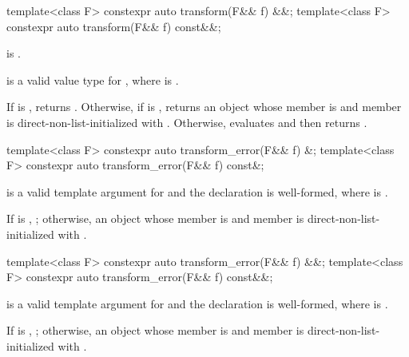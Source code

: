 %
\begin{itemdecl}
template<class F> constexpr auto transform(F&& f) &&;
template<class F> constexpr auto transform(F&& f) const&&;
\end{itemdecl}

\begin{itemdescr}
\pnum
\constraints
{} is .

\pnum
\mandates
{} is a valid value type for , where  is .

\pnum
\effects
If  is , returns . Otherwise, if  is , returns an  object whose  member is  and  member is direct-non-list-initialized with . Otherwise, evaluates  and then returns .
\end{itemdescr}

%
\begin{itemdecl}
template<class F> constexpr auto transform_error(F&& f) &;
template<class F> constexpr auto transform_error(F&& f) const&;
\end{itemdecl}

\begin{itemdescr}
\pnum
\mandates
{} is a valid template argument for  and the declaration  is well-formed, where  is .

\pnum
\returns
If  is , ; otherwise, an  object whose  member is  and  member is direct-non-list-initialized with .
\end{itemdescr}

%
\begin{itemdecl}
template<class F> constexpr auto transform_error(F&& f) &&;
template<class F> constexpr auto transform_error(F&& f) const&&;
\end{itemdecl}

\begin{itemdescr}
\pnum
\mandates
{} is a valid template argument for  and the declaration  is well-formed, where  is .

\pnum
\returns
If  is , ; otherwise, an  object whose  member is  and  member is direct-non-list-initialized with .
\end{itemdescr}

